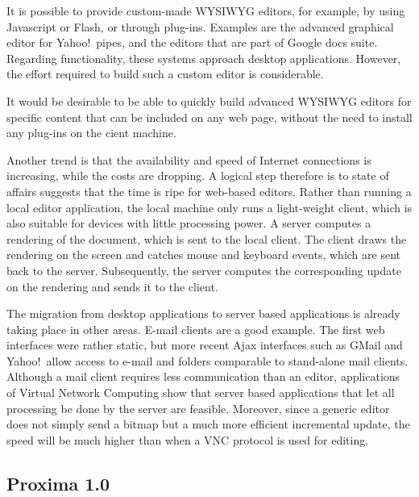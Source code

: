 \documentclass[10pt]{article}
\begin{document}
It is possible to provide custom-made WYSIWYG editors, for example, by using Javascript or Flash, or through plug-ins. Examples are the advanced graphical editor for Yahoo!\ pipes, and the editors that are part of Google docs suite. Regarding functionality, these systems approach desktop applications. However, the effort required to build such a custom editor is considerable.

It would be desirable to be able to quickly build advanced WYSIWYG editors for specific content that can be included on any web page, without the need to install any plug-ins on the cient machine.


\bc
Another trend is that the availability and speed of Internet connections is increasing, while the costs are dropping. A logical step therefore is to state of affairs suggests that the time is ripe for web-based editors. Rather than running a local editor application, the local machine only runs a light-weight client, which is also suitable for devices with little processing power. A server computes a rendering of the document, which is sent to the local client. The client draws the rendering on the screen and catches mouse and keyboard events, which are sent back to the server. Subsequently, the server computes the corresponding update on the rendering and sends it to the client.

The migration from desktop applications to server based applications is already taking place in other areas. E-mail clients are a good example. The first web interfaces were rather static, but more recent Ajax interfaces such as GMail and Yahoo!\ allow access to e-mail and folders comparable to stand-alone mail clients. Although a mail client requires less communication than an editor, applications of Virtual Network Computing show that server based applications that let all processing be done by the server are feasible. Moreover, since a generic editor does not simply send a bitmap but a much more efficient incremental update, the speed will be much higher than when a VNC protocol is used for editing. 
\ec

\subsection{Proxima 1.0}
\end{document}
